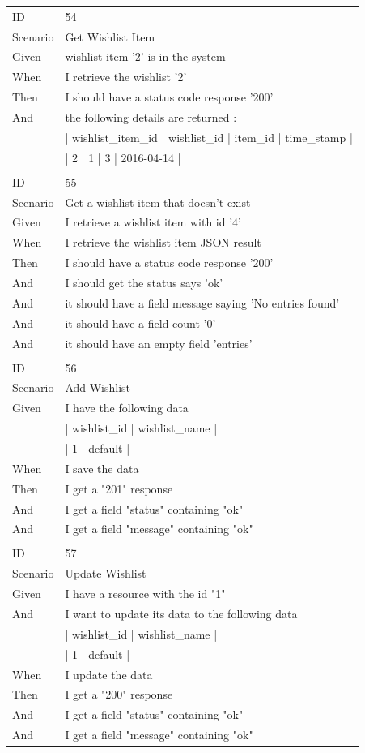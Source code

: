 \documentclass{report}
\begin{document}
\begin{tabular}{ l l }
ID 			& 54\\
Scenario		& Get Wishlist Item \\
Given 		& wishlist item '2' is in the system \\
When 		& I retrieve the wishlist '2' \\
Then 		& I should have a status code response '200' \\
And 			& the following details are returned : \\
      		& | wishlist\_item\_id | wishlist\_id | item\_id | time\_stamp | \\
      		& | 2 | 1 | 3 | 2016-04-14 | \\ \\
ID 			& 55\\
Scenario		& Get a wishlist item that doesn't exist \\
Given 		& I retrieve a wishlist item with id '4' \\
When 		& I retrieve the wishlist item JSON result \\
Then 		& I should have a status code response '200' \\
And 			& I should get the status says 'ok' \\
And 			& it should  have a field message saying 'No entries found' \\
And 			& it should  have a field count '0' \\
And 			& it should  have an empty field 'entries' \\ \\
ID 			& 56\\
Scenario		& Add Wishlist \\
Given 		& I have the following data \\
      		& | wishlist\_id | wishlist\_name | \\
      		& | 1      | default      | \\
When 		& I save the data \\
Then 		& I get a "201" response \\ 
And 			& I get a field "status" containing "ok" \\
And 			& I get a field "message" containing "ok" \\ \\
ID 			& 57\\
Scenario		& Update Wishlist \\
Given 		& I have a resource with the id "1" \\
And 			& I want to update its data to the following data \\
      		& | wishlist\_id | wishlist\_name | \\
      		& | 1      | default      |\\
When 		& I update the data \\
Then 		& I get a "200" response \\
And 			& I get a field "status" containing "ok" \\
And 			& I get a field "message" containing "ok" \\
\end{tabular}
\newpage
\end{document}
